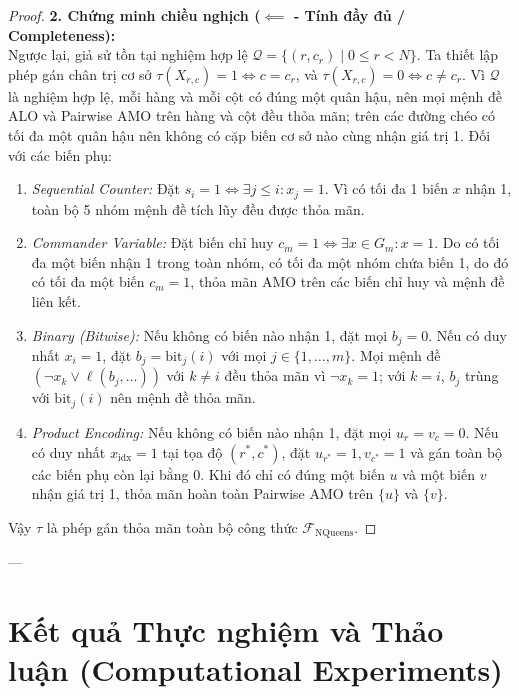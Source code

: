 \documentclass[a4paper,fleqn]{cas-sc}
\begin{document}
\begin{proof}
\noindent\textbf{2. Chứng minh chiều nghịch ($\impliedby$ - Tính đầy đủ / Completeness):}\\
Ngược lại, giả sử tồn tại nghiệm hợp lệ $\mathcal{Q} = \{(r, c_r) \mid 0 \le r < N\}$. Ta thiết lập phép gán chân trị cơ sở $\tau(X_{r,c}) = 1 \iff c = c_r$, và $\tau(X_{r,c}) = 0 \iff c \neq c_r$.
Vì $\mathcal{Q}$ là nghiệm hợp lệ, mỗi hàng và mỗi cột có đúng một quân hậu, nên mọi mệnh đề ALO và Pairwise AMO trên hàng và cột đều thỏa mãn; trên các đường chéo có tối đa một quân hậu nên không có cặp biến cơ sở nào cùng nhận giá trị 1.
Đối với các biến phụ:
\begin{enumerate}
    \item \textit{Sequential Counter:} Đặt $s_i = 1 \iff \exists j \le i: x_j = 1$. Vì có tối đa 1 biến $x$ nhận 1, toàn bộ 5 nhóm mệnh đề tích lũy đều được thỏa mãn.
    \item \textit{Commander Variable:} Đặt biến chỉ huy $c_m = 1 \iff \exists x \in G_m: x = 1$. Do có tối đa một biến nhận 1 trong toàn nhóm, có tối đa một nhóm chứa biến 1, do đó có tối đa một biến $c_m = 1$, thỏa mãn AMO trên các biến chỉ huy và mệnh đề liên kết.
    \item \textit{Binary (Bitwise):} Nếu không có biến nào nhận 1, đặt mọi $b_j = 0$. Nếu có duy nhất $x_i = 1$, đặt $b_j = \text{bit}_j(i)$ với mọi $j \in \{1, \dots, m\}$. Mọi mệnh đề $(\neg x_k \lor \ell(b_j, \dots))$ với $k \neq i$ đều thỏa mãn vì $\neg x_k = 1$; với $k = i$, $b_j$ trùng với $\text{bit}_j(i)$ nên mệnh đề thỏa mãn.
    \item \textit{Product Encoding:} Nếu không có biến nào nhận 1, đặt mọi $u_r = v_c = 0$. Nếu có duy nhất $x_{\text{idx}} = 1$ tại tọa độ $(r^*, c^*)$, đặt $u_{r^*} = 1, v_{c^*} = 1$ và gán toàn bộ các biến phụ còn lại bằng 0. Khi đó chỉ có đúng một biến $u$ và một biến $v$ nhận giá trị 1, thỏa mãn hoàn toàn Pairwise AMO trên $\{u\}$ và $\{v\}$.
\end{enumerate}
Vậy $\tau$ là phép gán thỏa mãn toàn bộ công thức $\mathcal{F}_{\text{NQueens}}$.
\end{proof}

---

\section{Kết quả Thực nghiệm và Thảo luận (Computational Experiments)}
\end{document}
